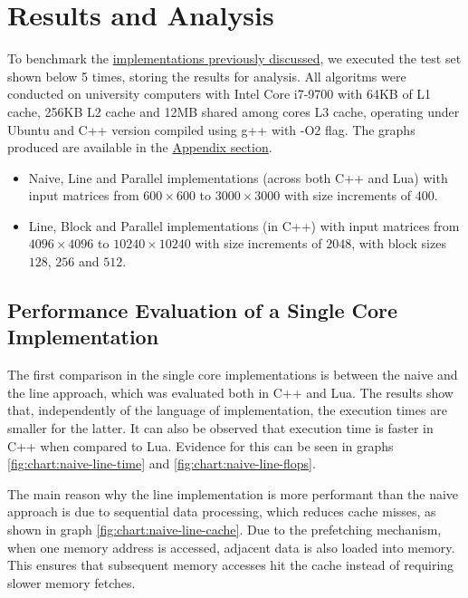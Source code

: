 \section{Results and Analysis} \label{section:results}

To benchmark the \hyperref[section:algorithms]{implementations previously discussed}, we executed the test set shown below 5 times, storing the results for analysis. All algoritms were conducted on university computers with Intel Core i7-9700 with 64KB of L1 cache, 256KB L2 cache and 12MB shared among cores L3 cache, operating under Ubuntu and C++ version compiled using g++ with -O2 flag. The graphs produced are available in the \hyperref[section:appendix]{Appendix section}.

\begin{itemize}
    \item Naive, Line and Parallel implementations (across both C++ and Lua) with input matrices from $600 \times 600$ to $3000 \times 3000$ with size increments of $400$.
    \item Line, Block and Parallel implementations (in C++) with input matrices from $4096 \times 4096$ to $10240 \times 10240$ with size increments of $2048$, with block sizes $128$, $256$ and $512$.
\end{itemize}

\subsection{Performance Evaluation of a Single Core Implementation}

The first comparison in the single core implementations is between the naive and the line approach, which was evaluated both in C++ and Lua. The results show that, independently of the language of implementation, the execution times are smaller for the latter. It can also be observed that execution time is faster in C++ when compared to Lua. Evidence for this can be seen in graphs \ref{fig:chart:naive-line-time} and \ref{fig:chart:naive-line-flops}.

The main reason why the line implementation is more performant than the naive approach is due to sequential data processing, which reduces cache misses, as shown in graph \ref{fig:chart:naive-line-cache}. Due to the prefetching mechanism, when one memory address is accessed, adjacent data is also loaded into memory. This ensures that subsequent memory accesses hit the cache instead of requiring slower memory fetches.

